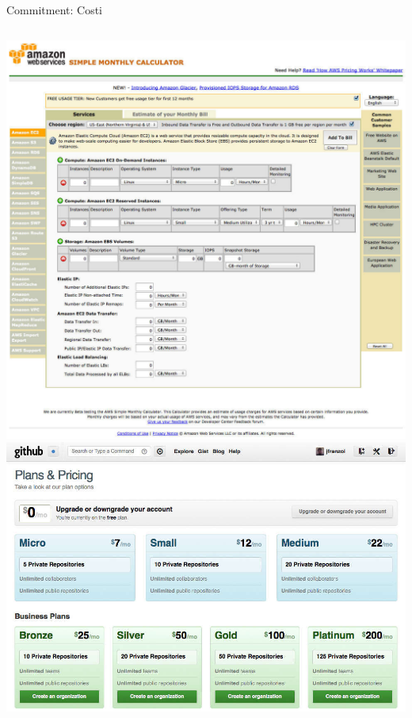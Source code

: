 \begin{frame}{Commitment: Costi}
\begin{columns}[T]
	    \begin{column}{.5\textwidth}
			\hspace*{-0.8cm} \includegraphics[scale=0.13]{images/costs-1}
			\\ \vspace*{-1cm}
			\hspace*{0.2cm} \includegraphics[scale=0.15]{images/costs-2}			
		    \end{column}
		\end{columns}

	\end{frame}
	
